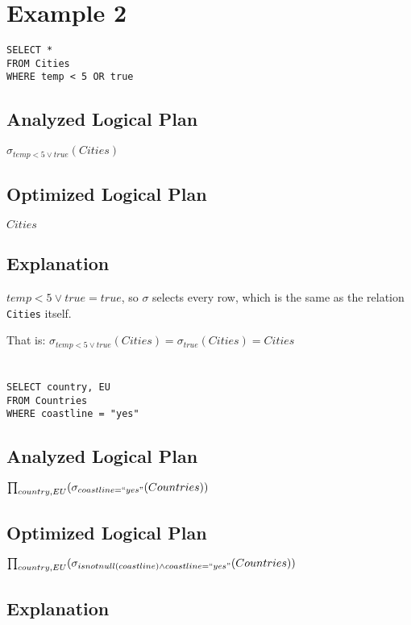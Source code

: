\documentclass[12pt]{article}
\begin{document}
\newpage

\section*{Example 2}
\begin{verbatim}
SELECT *
FROM Cities
WHERE temp < 5 OR true
\end{verbatim}

\subsection*{Analyzed Logical Plan}
$\sigma_{temp < 5 \vee true}(Cities)$

\subsection*{Optimized Logical Plan}
$Cities$

\subsection*{Explanation}
$temp < 5 \vee true = true$, so $\sigma$ selects every row,
which is the same as the relation \verb|Cities| itself.

That is:
$\sigma_{temp < 5 \vee true}(Cities) = \sigma_{true}(Cities) = Cities$

\newpage

\section{}
\begin{verbatim}
SELECT country, EU
FROM Countries
WHERE coastline = "yes"
\end{verbatim}

\subsection*{Analyzed Logical Plan}

$\prod_{country, EU}(\sigma_{coastline = ``yes"}(Countries))$

\subsection*{Optimized Logical Plan}

$\prod_{country, EU}(\sigma_{isnotnull(coastline) \wedge coastline = ``yes"}(Countries))$

\subsection*{Explanation}
\end{document}

